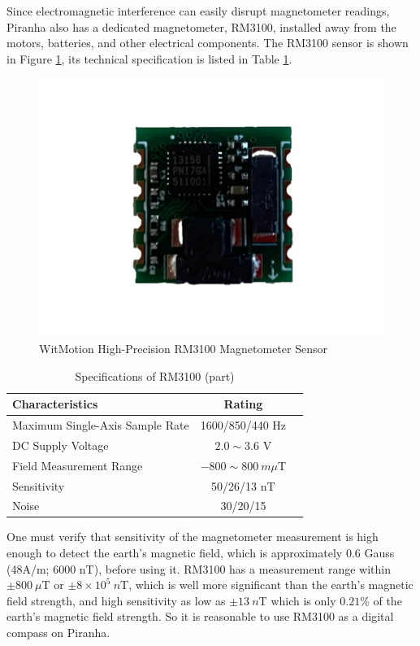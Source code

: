 Since electromagnetic interference can easily disrupt magnetometer readings, Piranha also has a dedicated magnetometer, RM3100, installed away from the motors, batteries, and other electrical components. The RM3100 sensor is shown in Figure \ref{fig:03rm3100}, its technical specification is listed in Table \ref{table:03rm3100}.

\begin{figure}[ht]
    \centering
    \includegraphics[width=.6\textwidth]{images/03rm3100.png}
    \caption{WitMotion High-Precision RM3100 Magnetometer Sensor}
    \label{fig:03rm3100}
\end{figure}

\begin{table}[ht]
\caption{Specifications of RM3100 (part)} %
\centering %
\renewcommand{\arraystretch}{0.8}
\begin{tabular}{l c l} %
\hline
\textbf{Characteristics} & \textbf{Rating} \\ 
\hline %
Maximum Single-Axis Sample Rate & 1600/850/440 Hz \\
DC Supply Voltage & $2.0\sim3.6$ V \\
Field Measurement Range & $-800 \sim 800\ m\mu$T \\
Sensitivity & 50/26/13 nT \\
Noise & 30/20/15 \\
\hline
\end{tabular}
\label{table:03rm3100} %
\end{table}

One must verify that sensitivity of the magnetometer measurement is high enough to detect the earth's magnetic field, which is approximately 0.6 Gauss (48A/m; 6000 nT), before using it. RM3100 has a measurement range within $\pm 800\ \mu$T or $\pm 8\times 10^5\ n$T, which is well more significant than the earth's magnetic field strength, and high sensitivity as low as $\pm 13\ n$T which is only $0.21\%$ of the earth's magnetic field strength. So it is reasonable to use RM3100 as a digital compass on Piranha.

